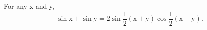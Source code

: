 For any x and y, \[ \sin \mathrm{x} + \sin \mathrm{y} 
= 2 \sin \frac{1}{2}( \mathrm{x + y} ) \cos \frac{1}{2}( \mathrm{x - y} ) . \]